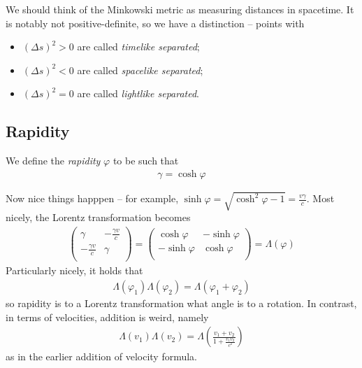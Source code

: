 \documentclass{../../template/note}
\begin{document}
    We should think of the Minkowski metric as measuring distances in spacetime. It is notably not positive-definite, so we have a distinction --  points with
    \begin{itemize}
        \item \((\Delta s)^2 > 0\) are called \emph{timelike separated};
        \item \((\Delta s)^2 < 0\) are called \emph{spacelike separated};
        \item \((\Delta s)^2 = 0\) are called \emph{lightlike separated}.
    \end{itemize}
    
    \subsection{Rapidity}

    \begin{definition}[Rapidity]
        We define the \emph{rapidity} \(\varphi\) to be such that 
        \begin{align*}
            \gamma = \cosh \varphi
        \end{align*}
    \end{definition}
    
    Now nice things happpen -- for example, \(\sinh \varphi = \sqrt{\cosh^2 \varphi - 1} = \frac{v\gamma}{c}\). Most nicely, the Lorentz transformation becomes
    \begin{align*}
        \begin{pmatrix}
         \gamma & -\frac{\gamma v}{c} \\
         -\frac{\gamma v}{c} & \gamma \\
        \end{pmatrix} = \begin{pmatrix}
         \cosh \varphi & -\sinh \varphi \\
         -\sinh \varphi & \cosh \varphi \\
        \end{pmatrix} = \Lambda(\varphi)
    \end{align*}
    Particularly nicely, it holds that
    \begin{align*}
        \Lambda(\varphi_1)\Lambda(\varphi_2) = \Lambda(\varphi_1 + \varphi_2)
    \end{align*}
    so rapidity is to a Lorentz transformation what angle is to a rotation. In contrast, in terms of velocities, addition is weird, namely
    \begin{align*}
        \Lambda(v_1)\Lambda(v_2) = \Lambda\left(\frac{v_1+v_2}{1+\frac{v_1v_2}{c^2}}\right)
    \end{align*}
    as in the earlier addition of velocity formula.
    
\end{document}
